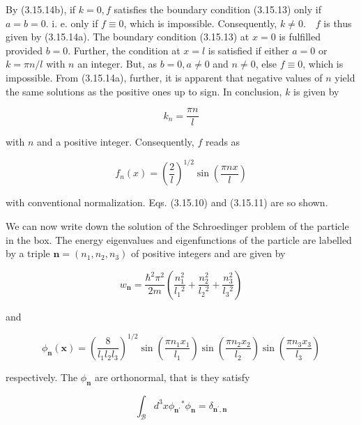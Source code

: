 \documentclass{article}
\begin{document}
By (3.15.14b), if $k=0, f$ satisfies the boundary condition (3.15.13) only if $a=b=0$. i. e. only if $f \equiv 0$, which is impossible. Consequently, $k \neq 0 . \quad f$ is thus given by (3.15.14a). The boundary condition (3.15.13) at $x=0$ is fulfilled provided $b=0$. Further, the condition at $x=l$ is satisfied if either $a=0$ or $k=\pi n / l$ with $n$ an integer. But, as $b=0, a \neq 0$ and $n \neq 0$, else $f \equiv 0$, which is impossible. From (3.15.14a),
further, it is apparent that negative values of $n$ yield the same solutions as the positive ones up to sign. In conclusion, $k$ is given by
 
\begin{equation*}
k_{n}=\frac{\pi n}{l} \tag{3.15.15}
\end{equation*}
 
with $n$ and a positive integer. Consequently, $f$ reads as
 
\begin{equation*}
f_{n}(x)=\left(\frac{2}{l}\right)^{1 / 2} \sin \left(\frac{\pi n x}{l}\right) \tag{3.15.16}
\end{equation*}
 
with conventional normalization. Eqs. (3.15.10) and (3.15.11) are so shown.

We can now write down the solution of the Schroedinger problem of the particle in the box. The energy eigenvalues and eigenfunctions of the particle are labelled by a triple $\boldsymbol{n}=\left(n_{1}, n_{2}, n_{3}\right)$ of positive integers and are given by
 
\begin{equation*}
w_{\boldsymbol{n}}=\frac{\hbar^{2} \pi^{2}}{2 m}\left(\frac{n_{1}^{2}}{l_{1}{ }^{2}}+\frac{n_{2}^{2}}{l_{2}{ }^{2}}+\frac{n_{3}^{2}}{l_{3}{ }^{2}}\right) \tag{3.15.17}
\end{equation*}
 
and
 
\begin{equation*}
\phi_{\boldsymbol{n}}(\boldsymbol{x})=\left(\frac{8}{l_{1} l_{2} l_{3}}\right)^{1 / 2} \sin \left(\frac{\pi n_{1} x_{1}}{l_{1}}\right) \sin \left(\frac{\pi n_{2} x_{2}}{l_{2}}\right) \sin \left(\frac{\pi n_{3} x_{3}}{l_{3}}\right) \tag{3.15.18}
\end{equation*}
 
respectively. The $\phi_{\boldsymbol{n}}$ are orthonormal, that is they satisfy
 
\begin{equation*}
\int_{\mathcal{B}} d^{3} x \phi_{\boldsymbol{n}^{\prime}}{ }^{*} \phi_{\boldsymbol{n}}=\delta_{\boldsymbol{n}^{\prime}, \boldsymbol{n}} \tag{3.15.19}
\end{equation*}
 
\end{document}

